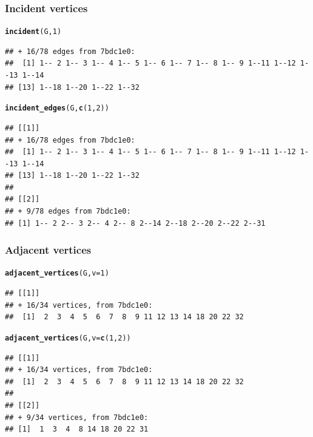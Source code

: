 \documentclass[aspectratio=169]{beamer}\usepackage[]{graphicx}\usepackage[]{xcolor}
\makeatletter
\newcommand{\hlnum}[1]{\textcolor[rgb]{0.686,0.059,0.569}{#1}}%
\newcommand{\hldef}[1]{\textcolor[rgb]{0.345,0.345,0.345}{#1}}%
\newcommand{\hlkwc}[1]{\textcolor[rgb]{0.333,0.667,0.333}{#1}}%
\newcommand{\hlkwd}[1]{\textcolor[rgb]{0.737,0.353,0.396}{\textbf{#1}}}%
\newenvironment{kframe}{%
 \def\at@end@of@kframe{}%
 \ifinner\ifhmode%
  \def\at@end@of@kframe{\end{minipage}}%
  \begin{minipage}{\columnwidth}%
 \fi\fi%
 \def\FrameCommand##1{\hskip\@totalleftmargin \hskip-\fboxsep
 \colorbox{shadecolor}{##1}\hskip-\fboxsep
     \hskip-\linewidth \hskip-\@totalleftmargin \hskip\columnwidth}%
 \MakeFramed {\advance\hsize-\width
   \@totalleftmargin\z@ \linewidth\hsize
   \@setminipage}}%
 {\par\unskip\endMakeFramed%
 \at@end@of@kframe}
\newenvironment{knitrout}{}{} %
\makeatother
\begin{document}
\begin{frame}[fragile]\frametitle{Incident vertices}
\begin{knitrout}
\color{fgcolor}\begin{kframe}
\begin{alltt}
\hlkwd{incident}\hldef{(G,} \hlnum{1}\hldef{)}
\end{alltt}
\begin{verbatim}
## + 16/78 edges from 7bdc1e0:
##  [1] 1-- 2 1-- 3 1-- 4 1-- 5 1-- 6 1-- 7 1-- 8 1-- 9 1--11 1--12 1--13 1--14
## [13] 1--18 1--20 1--22 1--32
\end{verbatim}
\begin{alltt}
\hlkwd{incident_edges}\hldef{(G,} \hlkwd{c}\hldef{(}\hlnum{1}\hldef{,} \hlnum{2}\hldef{))}
\end{alltt}
\begin{verbatim}
## [[1]]
## + 16/78 edges from 7bdc1e0:
##  [1] 1-- 2 1-- 3 1-- 4 1-- 5 1-- 6 1-- 7 1-- 8 1-- 9 1--11 1--12 1--13 1--14
## [13] 1--18 1--20 1--22 1--32
## 
## [[2]]
## + 9/78 edges from 7bdc1e0:
## [1] 1-- 2 2-- 3 2-- 4 2-- 8 2--14 2--18 2--20 2--22 2--31
\end{verbatim}
\end{kframe}
\end{knitrout}
\end{frame}

\begin{frame}[fragile]\frametitle{Adjacent vertices}
\begin{knitrout}
\color{fgcolor}\begin{kframe}
\begin{alltt}
\hlkwd{adjacent_vertices}\hldef{(G,} \hlkwc{v} \hldef{=} \hlnum{1}\hldef{)}
\end{alltt}
\begin{verbatim}
## [[1]]
## + 16/34 vertices, from 7bdc1e0:
##  [1]  2  3  4  5  6  7  8  9 11 12 13 14 18 20 22 32
\end{verbatim}
\begin{alltt}
\hlkwd{adjacent_vertices}\hldef{(G,} \hlkwc{v} \hldef{=} \hlkwd{c}\hldef{(}\hlnum{1}\hldef{,} \hlnum{2}\hldef{))}
\end{alltt}
\begin{verbatim}
## [[1]]
## + 16/34 vertices, from 7bdc1e0:
##  [1]  2  3  4  5  6  7  8  9 11 12 13 14 18 20 22 32
## 
## [[2]]
## + 9/34 vertices, from 7bdc1e0:
## [1]  1  3  4  8 14 18 20 22 31
\end{verbatim}
\end{kframe}
\end{knitrout}
\end{frame}
\end{document}
